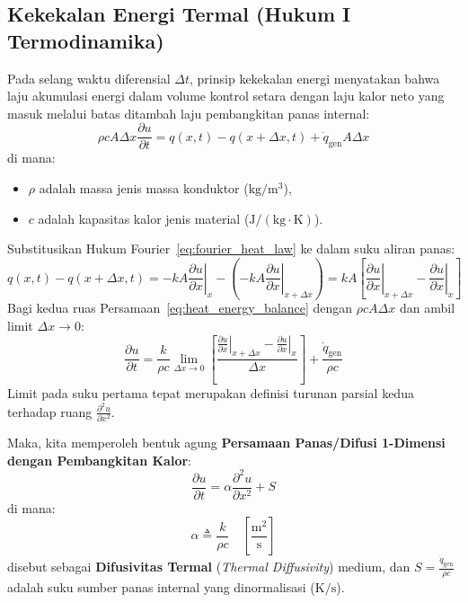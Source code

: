 \documentclass[11pt,a4paper]{article}
\theoremstyle{definition}
\begin{document}
\subsection{Kekekalan Energi Termal (Hukum I Termodinamika)}
Pada selang waktu diferensial $\Delta t$, prinsip kekekalan energi menyatakan bahwa laju akumulasi energi dalam volume kontrol setara dengan laju kalor neto yang masuk melalui batas ditambah laju pembangkitan panas internal:
\begin{equation}
    \rho c A \Delta x \frac{\partial u}{\partial t} = q(x, t) - q(x + \Delta x, t) + \dot{q}_{\text{gen}} A \Delta x
    \label{eq:heat_energy_balance}
\end{equation}
di mana:
\begin{itemize}[leftmargin=*]
    \item $\rho$ adalah massa jenis massa konduktor ($\text{kg}/\text{m}^3$),
    \item $c$ adalah kapasitas kalor jenis material ($\text{J}/(\text{kg}\cdot\text{K})$).
\end{itemize}

Substitusikan Hukum Fourier~\eqref{eq:fourier_heat_law} ke dalam suku aliran panas:
\begin{equation*}
    q(x, t) - q(x + \Delta x, t) = -kA \left. \frac{\partial u}{\partial x} \right|_{x} - \left( -kA \left. \frac{\partial u}{\partial x} \right|_{x+\Delta x} \right) = kA \left[ \left. \frac{\partial u}{\partial x} \right|_{x+\Delta x} - \left. \frac{\partial u}{\partial x} \right|_{x} \right]
\end{equation*}
Bagi kedua ruas Persamaan~\eqref{eq:heat_energy_balance} dengan $\rho c A \Delta x$ dan ambil limit $\Delta x \to 0$:
\begin{equation}
    \frac{\partial u}{\partial t} = \frac{k}{\rho c} \lim_{\Delta x \to 0} \left[ \frac{\left.\frac{\partial u}{\partial x}\right|_{x+\Delta x} - \left.\frac{\partial u}{\partial x}\right|_{x}}{\Delta x} \right] + \frac{\dot{q}_{\text{gen}}}{\rho c}
\end{equation}
Limit pada suku pertama tepat merupakan definisi turunan parsial kedua terhadap ruang $\frac{\partial^2 u}{\partial x^2}$.

Maka, kita memperoleh bentuk agung \textbf{Persamaan Panas/Difusi 1-Dimensi dengan Pembangkitan Kalor}:
\begin{equation}
    \frac{\partial u}{\partial t} = \alpha \frac{\partial^2 u}{\partial x^2} + S
    \label{eq:heat_eq_with_source}
\end{equation}
di mana:
\begin{equation}
    \alpha \triangleq \frac{k}{\rho c} \quad \left[\frac{\text{m}^2}{\text{s}}\right]
    \label{eq:thermal_diffusivity}
\end{equation}
disebut sebagai \textbf{Difusivitas Termal} (\textit{Thermal Diffusivity}) medium, dan $S = \frac{\dot{q}_{\text{gen}}}{\rho c}$ adalah suku sumber panas internal yang dinormalisasi ($\text{K}/\text{s}$).
\end{document}
